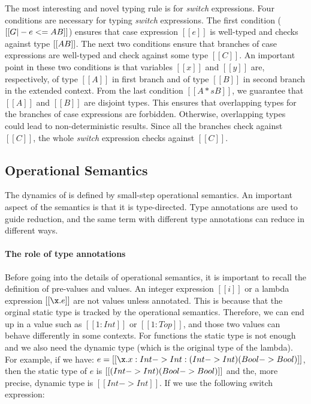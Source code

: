 The most interesting and novel typing rule is for
\emph{switch} expressions. Four conditions are necessary for typing
\emph{switch} expressions.
The first condition ($[[G |-
    e <= A \/ B]]$) ensures that case expression $[[e]]$ is well-typed
and checks against type $[[A \/ B]]$. The next two conditions ensure that
branches of case expressions are well-typed and check against some type
$[[C]]$. An important point in these two conditions is that variables
$[[x]]$ and $[[y]]$ are, respectively, of type $[[A]]$ in first branch and of type $[[B]]$ in
second branch in the extended context. From the last condition
$[[A *s B]]$, we guarantee that $[[A]]$ and $[[B]]$ are disjoint
types. This ensures that overlapping types for the branches of case expressions
are forbidden. Otherwise, overlapping types could lead to
non-deterministic results.
Since all the branches check against $[[C]]$, the whole
\emph{switch} expression checks against $[[C]]$.

\begin{comment}
\begin{figure}[t]
  \begin{small}
    \centering
    \drules[typ]{$ [[G |- e dirflag A]] $}{Bidirectional Typing}{int, var, ann, app, sub, abs, typeof}
  \end{small}
  \caption{Typing for \cal.}
  \label{fig:union:typ}
\end{figure}
\end{comment}

\subsection{Operational Semantics}
\label{sec:union:os}
The dynamics of \cal is defined by small-step operational semantics.
An important aspect of the semantics is that it is type-directed.
Type annotations are used to guide reduction, and the same term
with different type annotations can reduce in different ways.

\paragraph{The role of type annotations}
Before going
into the details of operational semantics, it is important to recall
the definition of pre-values and values. An integer expression $[[i]]$ or a
lambda expression $[[\x.e]]$ are not values unless annotated. This is
because that the orginal static type is tracked by the operational semantics.
Therefore, we can end up in a value such as $[[1 : Int]]$ or $[[1 : Top]]$,
and those two values can behave differently in some contexts.
For functions the static type is not enough and we also need the dynamic type
(which is the original type of the lambda).
For example, if we have:
$e = [[\x.x:Int->Int:(Int->Int)\/(Bool->Bool)]]$, then the static type of $e$ is
$[[(Int->Int)\/(Bool->Bool)]]$ and the, more precise, dynamic type is
$[[Int->Int]]$. If we use the following switch expression:

